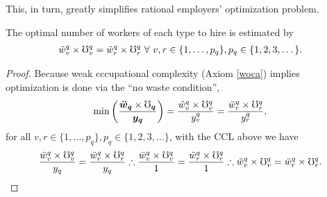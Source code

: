\documentclass[hidelinks, nonatbib]{elsarticle}
\begin{document}
This, in turn, greatly simplifies rational employers' optimization problem.
\begin{lemma}
    \label{wiol}
    The optimal number of workers of each type to hire is estimated by
    \begin{gather}
        \ddot{w}_{v}^{q}
        \times
        \mho_{v}^{q}
        =
        \ddot{w}_{r}^{q}
        \times
        \mho_{r}^{q}
        \
        \forall
        \
        v,r \in \{1, \dots, p_q\}
        ,
        p_q \in \{1, 2, 3, \dots\}
        .
    \end{gather}

    \begin{proof}
        Because weak cccupational complexity (Axiom \ref{woca}) implies optimization is done via the ``no waste condition'',
        \begin{gather}
            \min\left(
                \frac{
                    \boldsymbol{\ddot{w}_{q}}
                    \times
                    \boldsymbol{\mho_q}
                }{
                    \boldsymbol{y_q}
                }
            \right)
            =
            \frac{
                \ddot{w}_{v}^{q}
                \times
                \mho_{v}^{q}
            }{
                y_{v}^{q}
            }
            =
            \frac{
                \ddot{w}_{r}^{q}
                \times
                \mho_{r}^{q}
            }{
                y_{r}^{q}
            }
            ,
        \end{gather} 
        for all $v,r \in \{1, \dots, p_q\}, p_q \in \{1, 2, 3, \dots\}$, with the CCL above we have
        \begin{gather}
            \frac{
                \ddot{w}_{v}^{q}
                \times
                \mho_{v}^{q}
            }{
                y_q
            }
            =
            \frac{
                \ddot{w}_{r}^{q}
                \times
                \mho_{r}^{q}
            }{
                y_q
            }
            \therefore
            \frac{
                \ddot{w}_{v}^{q}
                \times
                \mho_{v}^{q}
            }{
                1
            }
            =
            \frac{
                \ddot{w}_{r}^{q}
                \times
                \mho_{r}^{q}
            }{
                1
            }
            \therefore
            \ddot{w}_{v}^{q}
            \times
            \mho_{v}^{q}
            =
            \ddot{w}_{r}^{q}
            \times
            \mho_{r}^{q}
            .
        \end{gather}
    \end{proof}
\end{lemma}
\end{document}
